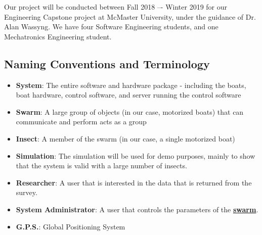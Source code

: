 \documentclass[11pt]{article}
\begin{document}
Our project will be conducted between Fall 2018 –- Winter 2019 for our Engineering Capstone project at McMaster University, under the guidance of Dr. Alan Wassyng. We have four Software Engineering students, and one Mechatronics Engineering student.

\subsection{Naming Conventions and Terminology}

\label{sec:definitions}
\begin{itemize}
\item \textbf{System}: The entire software and hardware package - including the boats,
boat hardware, control software, and server running the control software
\item \textbf{Swarm}: A large group of objects (in our case, motorized boats) that can communicate and perform acts as a group
\item \textbf{Insect}: A member of the swarm (in our case, a single motorized boat)
\item \textbf{Simulation}: The simulation will be used for demo purposes, mainly to show that
the system is valid with a large number of insects.
\item \textbf{Researcher}: A user that is interested in the data that is returned from the survey.
\item \textbf{System Administrator}: A user that controls the parameters of the \hyperref[sec:definitions]{\textbf{swarm}}.
\item \textbf{G.P.S.}: Global Positioning System
\end{itemize}
\end{document}
